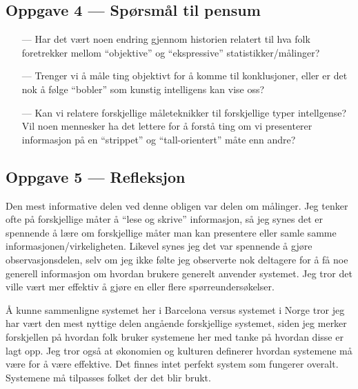 \documentclass{../../myassignment}
\begin{document}
	\subsection*{Oppgave 4 --- Spørsmål til pensum}

	\begin{itemize}
		\item[---] Har det v{\ae}rt noen endring gjennom historien relatert til hva folk foretrekker mellom ``objektive'' og ``ekspressive'' statistikker/m{\aa}linger?
		\item[---] Trenger vi {\aa} m{\aa}le ting objektivt for {\aa} komme til konklusjoner, eller er det nok {\aa} f{\o}lge ``bobler'' som kunstig intelligens kan vise oss?
		\item[---] Kan vi relatere forskjellige m{\aa}leteknikker til forskjellige typer intellgense? Vil noen mennesker ha det lettere for {\aa} forst{\aa} ting om vi presenterer informasjon p{\aa} en ``strippet'' og ``tall-orientert'' m{\aa}te enn andre? 
	\end{itemize}

	\subsection*{Oppgave 5 --- Refleksjon}

	Den mest informative delen ved denne obligen var delen om m{\aa}linger. Jeg tenker ofte p{\aa} forskjellige m{\aa}ter {\aa} ``lese og skrive'' informasjon, s{\aa} jeg synes det er spennende {\aa} l{\ae}re om forskjellige m{\aa}ter man kan presentere eller samle samme informasjonen/virkeligheten. Likevel synes jeg det var spennende {\aa} gj{\o}re observasjonsdelen, selv om jeg ikke f{\o}lte jeg observerte nok deltagere for {\aa} f{\aa} noe generell informasjon om hvordan brukere generelt anvender systemet. Jeg tror det ville v{\ae}rt mer effektiv {\aa} gj{\o}re en eller flere sp{\o}rreunders{\o}kelser.

	{\AA} kunne sammenligne systemet her i Barcelona versus systemet i Norge tror jeg har v{\ae}rt den  mest nyttige delen ang{\aa}ende forskjellige systemet, siden jeg merker forskjellen p{\aa} hvordan folk bruker systemene her med tanke p{\aa} hvordan disse er lagt opp. Jeg tror ogs{\aa} at {\o}konomien og kulturen definerer hvordan systemene m{\aa} v{\ae}re for {\aa} v{\ae}re effektive. Det finnes intet perfekt system som fungerer overalt. Systemene m{\aa} tilpasses folket der det blir brukt.
\end{document}
